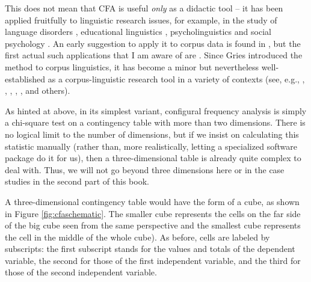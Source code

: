 This does not mean that CFA is useful \textit{only} as a didactic tool -- it has been applied fruitfully to linguistic research issues, for example, in the study of language disorders \citep{lautsch_strategische_1988}, educational linguistics \citep{fujioka_views_1997}, psycholinguistics \citep{hsu_infant_2000} and social psychology \citep{christmann_components_2000}. An early suggestion to apply it to corpus data is found in \citep{schmilz_zahlen_1983}, but the first actual such applications that I am aware of are \citep{gries_evidence_2002, gries_characteristics_2004}. Since Gries introduced the method to corpus linguistics, it has become a minor but nevertheless well-established as a corpus-linguistic research tool in a variety of contexts (see, e.g., \citealt{stefanowitsch_covarying_2005}, \citealt{kristiansen_channel_2008}, \citealt{liu_is_2010}, \citealt{goschler_beyond_2013}, \citealt{buschfeld_cognitive_2014}, \citealt{hilpert_constructional_2015} and others).


As hinted at above, in its simplest variant, configural frequency analysis is simply a chi-square test on a contingency table with more than two dimensions. There is no logical limit to the number of dimensions, but if we insist on calculating this statistic manually (rather than, more realistically, letting a specialized software package do it for us), then a three-dimensional table is already quite complex to deal with. Thus, we will not go beyond three dimensions here or in the case studies in the second part of this book.

A three-dimensional contingency table would have the form of a cube, as shown in Figure \ref{fig:cfaschematic}. The smaller cube represents the cells on the far side of the big cube seen from the same perspective and the smallest cube represents the cell in the middle of the whole cube). As before, cells are labeled by subscripts: the first subscript stands for the values and totals of the dependent variable, the second for those of the first independent variable, and the third for those of the second independent variable. 

